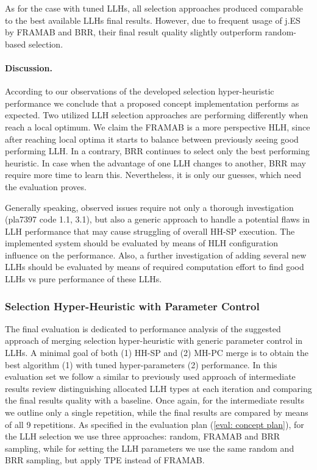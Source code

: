 As for the case with tuned LLHs, all selection approaches produced comparable to the best available LLHs final results. However, due to frequent usage of j.ES by FRAMAB and BRR, their final result quality slightly outperform random-based selection.


\paragraph{Discussion.} According to our observations of the developed selection hyper-heuristic performance we conclude that a proposed concept implementation performs as expected. Two utilized LLH selection approaches are performing differently when reach a local optimum. We claim the FRAMAB is a more perspective HLH, since after reaching local optima it starts to balance between previously seeing good performing LLH. In a contrary, BRR continues to select only the best performing heuristic. In case when the advantage of one LLH changes to another, BRR may require more time to learn this. Nevertheless, it is only our guesses, which need the evaluation proves.

Generally speaking, observed issues require not only a thorough investigation (pla7397 code 1.1, 3.1), but also a generic approach to handle a potential flaws in LLH performance that may cause struggling of overall HH-SP execution. The implemented system should be evaluated by means of HLH configuration influence on the performance. Also, a further investigation of adding several new LLHs should be evaluated by means of required computation effort to find good LLHs vs pure performance of these LLHs.


\subsubsection{Selection Hyper-Heuristic with Parameter Control}
The final evaluation is dedicated to performance analysis of the suggested approach of merging selection hyper-heuristic with generic parameter control in LLHs. A minimal goal of both (1) HH-SP and (2) MH-PC merge is to obtain the best algorithm (1) with tuned hyper-parameters (2) performance. In this evaluation set we follow a similar to previously used approach of intermediate results review distinguishing allocated LLH types at each iteration and comparing the final results quality with a baseline. Once again, for the intermediate results we outline only a single repetition, while the final results are compared by means of all 9 repetitions. As specified in the evaluation plan (\cref{eval: concept plan}), for the LLH selection we use three approaches: random, FRAMAB and BRR sampling, while for setting the LLH parameters we use the same random and BRR sampling, but apply TPE instead of FRAMAB.

